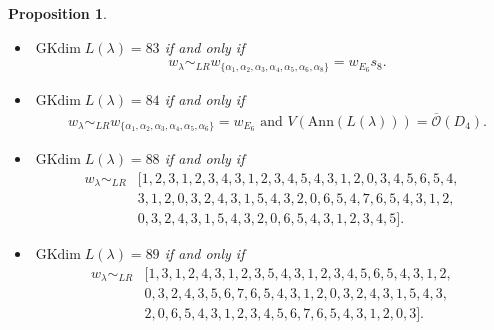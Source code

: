 \documentclass[reqno,12pt]{amsart}
\numberwithin{equation}{section}
\theoremstyle{plain}
\newtheorem{Prop}[Thm]{Proposition}
\theoremstyle{definition}
\newcommand{\lam}{\lambda}
\newcommand{\Ann}{\mathrm{Ann}}
\newcommand{\gkd}{\operatorname{GKdim}}
\begin{document}
\begin{Prop}
\begin{itemize}
        \item[(11)] $\gkd L(\lambda)=83$ if and only if 
    \begin{align*}
           &w_{\lambda}\sim_{LR}w_{\{\alpha_1,\alpha_2,\alpha_3,\alpha_4,\alpha_5,\alpha_6,\alpha_8\}}=w_{E_6}s_8.  
      \end{align*}
     
     
     



     
 \item[(12)] $\gkd L(\lambda)=84$ if and only if \begin{align*}
          &w_{\lambda}\sim_{LR}w_{\{\alpha_1,\alpha_2,\alpha_3,\alpha_4,\alpha_5,\alpha_6\}}=w_{E_6}
          \text{~and~} V(\Ann (L(\lam)))=\overline{\mathcal{O}}(D_4).
      \end{align*}


\item[(13)] $\gkd L(\lambda)=88$ if and only if \begin{align*}
          w_{\lambda}\sim_{LR}   &
     [1, 2, 3, 1, 2, 3, 4, 3, 1, 2, 3, 4, 5, 4, 3, 1, 2, 0, 3, 4, 5, 6, 5, 4,\\& 3, 1, 2, 0, 3, 2, 4, 3, 1, 5, 4, 3, 2, 0, 6, 5, 4, 7, 6, 5, 4, 3, 1, 2,\\& 0, 3, 2, 4, 3, 1, 5, 4, 3, 2, 0, 6, 5, 4, 3, 1, 2, 3, 4, 5].
\end{align*}
\item[(14)] $\gkd L(\lambda)=89$ if and only if \begin{align*}
          w_{\lambda}\sim_{LR}   &
      [1, 3, 1, 2, 4, 3, 1, 2, 3, 5, 4, 3, 1, 2, 3, 4, 5, 6, 5, 4, 3, 1, 2,\\& 0, 3, 2, 4, 3, 5, 6, 7, 6, 5, 4, 3, 1, 2, 0, 3, 2, 4, 3, 1, 5, 4, 3,\\& 2, 0, 6, 5, 4, 3, 1, 2, 3, 4, 5, 6, 7, 6, 5, 4, 3, 1, 2, 0, 3].
\end{align*}


\end{itemize}
\end{Prop}
\end{document}
